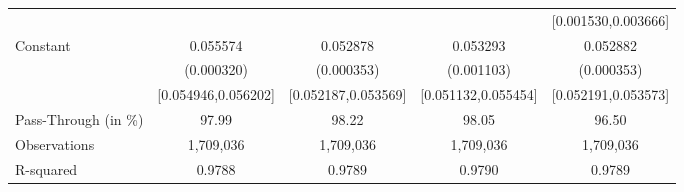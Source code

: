 {\begin{tabular}{l*{4}{c}}
                    &                     &                     &                     &[0.001530,0.003666]         \\
Constant            &    0.055574\sym{***}&    0.052878\sym{***}&    0.053293\sym{***}&    0.052882\sym{***}\\
                    &  (0.000320)         &  (0.000353)         &  (0.001103)         &  (0.000353)         \\
                    &[0.054946,0.056202]         &[0.052187,0.053569]         &[0.051132,0.055454]         &[0.052191,0.053573]         \\
\midrule
Pass-Through (in \%)&       97.99         &       98.22         &       98.05         &       96.50         \\
Observations        &   1,709,036         &   1,709,036         &   1,709,036         &   1,709,036         \\
R-squared           &      0.9788         &      0.9789         &      0.9790         &      0.9789         \\
\bottomrule
\end{tabular}
}
